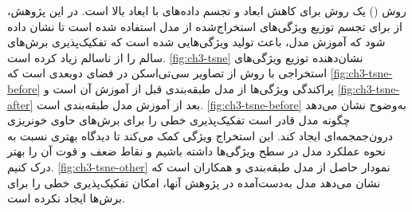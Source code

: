 روش
  ()
  یک روش برای کاهش ابعاد و تجسم داده‌های با ابعاد بالا است. در این پژوهش، از
    برای تجسم توزیع ویژگی‌های استخراج‌شده از مدل  
    استفاده شده است تا نشان داده شود که آموزش مدل، باعث تولید ویژگی‌هایی شده است که تفکیک‌پذیری برش‌های سالم را از ناسالم زیاد کرده است. 
     \autoref{fig:ch3-tsne}
 نشان‌دهنده توزیع ویژگی‌های استخراجی با روش 
  از تصاویر سی‌تی‌اسکن در فضای دو‌بعدی است که 
  \autoref{fig:ch3-tsne-before}
  پراکندگی ویژگی‌ها از مدل طبقه‌بندی قبل از آموزش آن است و 
    \autoref{fig:ch3-tsne-after}
    بعد از آموزش مدل طبقه‌بندی است. 
      \autoref{fig:ch3-tsne-before}
  به‌وضوح نشان می‌دهد چگونه مدل قادر است تفکیک‌پذیری خطی را برای برش‌های حاوی خونریزی درون‌جمجمه‌ای ایجاد کند. این استخراج ویژگی کمک می‌کند تا دیدگاه بهتری نسبت به نحوه عملکرد مدل در سطح ویژگی‌ها داشته باشیم و نقاط ضعف و قوت آن را بهتر درک کنیم. 
        \autoref{fig:ch3-tsne-other}
نمودار 
حاصل از مدل طبقه‌بندی 
\cite{Ganeshkumar2022Identification}
و همکاران است که نشان می‌دهد مدل به‌دست‌آمده در پژوهش آنها، امکان تفکیک‌پذیری خطی را برای برش‌ها ایجاد نکرده است.

